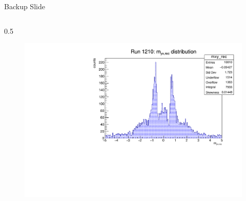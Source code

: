\documentclass{beamer}[10pt]
\begin{document}
\begin{frame}{Backup Slide}
\begin{columns}
\begin{column}{0.5\framewidth}
\begin{figure}[H]
  \centering
  \includegraphics[width= \textwidth]{figures/pdf/mxy_rec.pdf}
  \label{fig:enter-label}
\end{figure}
\end{column}
\end{columns}
\end{frame}
\end{document}
